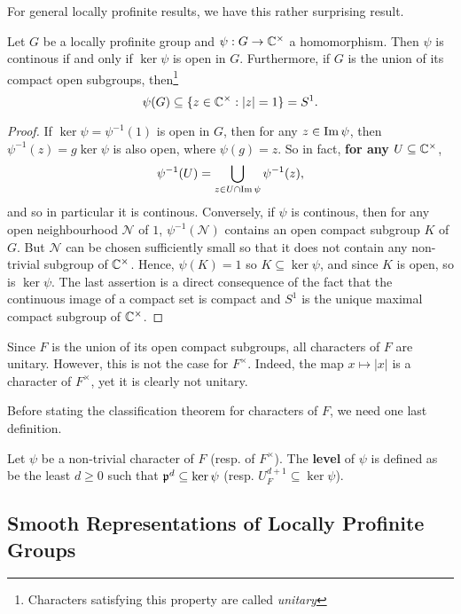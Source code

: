 For general locally profinite results, we have this rather surprising result. 
\begin{lemma}\label{lem_cont_chars}
    Let $G$ be a locally profinite group and $\psi: G\rightarrow\mathbb{C}^{\times}$ a homomorphism. Then $\psi$ is continous if and only if $\ker\psi$ is open in $G$. Furthermore, if $G$ is the union of its compact open subgroups, then\footnote{Characters satisfying this property are called \textit{unitary}} $$\psi(G)\subseteq\{z\in\mathbb{C}^{\times}:|z|=1\}=S^1.$$
\end{lemma}
\begin{proof}
    If $\ker\psi=\psi^{-1}(1)$ is open in $G$, then for any $z\in\operatorname{Im}\psi$, then $\psi^{-1}(z)=g\ker\psi$ is also open, where $\psi(g)=z$. So in fact, \textbf{for any} $U\subseteq\mathbb{C}^{\times}$, 
    $$\psi^{-1}(U)=\bigcup_{z\in U\cap\operatorname{Im}\psi}\psi^{-1}(z),$$
    and so in particular it is continous.
    Conversely, if $\psi$ is continous, then for any open neighbourhood $\mathcal{N}$ of $1$, $\psi^{-1}(\mathcal{N})$ contains an open compact subgroup $K$ of $G$. But $\mathcal{N}$ can be chosen sufficiently small so that it does not contain any non-trivial subgroup of $\mathbb{C}^{\times}$. Hence, $\psi(K)=1$ so $K\subseteq\ker\psi$, and since $K$ is open, so is $\ker\psi$.
    The last assertion is a direct consequence of the fact that the continuous image of a compact set is compact and $S^1$ is the unique maximal compact subgroup of $\mathbb{C}^{\times}$.
\end{proof}

Since $F$ is the union of its open compact subgroups, all characters of $F$ are unitary. However, this is not the case for $F^{\times}$. Indeed, the map $x\mapsto|x|$ is a character of $F^{\times}$, yet it is clearly not unitary. 

Before stating the classification theorem for characters of $F$, we need one last definition. 

\begin{defn}
    Let $\psi$ be a non-trivial character of $F$ (resp. of $F^{\times}$). The \textbf{level} of $\psi$ is defined as be the least $d\geq0$ such that $\mathfrak{p}^d\subseteq\ker\psi$ (resp. $U_F^{d+1}\subseteq\ker\psi$).
\end{defn}




\subsection{Smooth Representations of Locally Profinite Groups}

